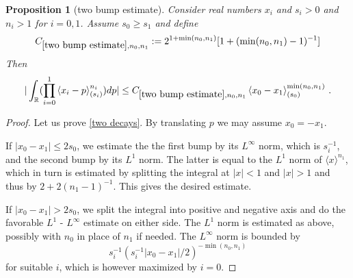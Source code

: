 \documentclass[12pt,reqno]{amsart}
\theoremstyle{plain}
\newtheorem{proposition}[theorem]{Proposition}
\numberwithin{equation}{section}
\theoremstyle{remark}
\newcommand{\R}{{\mathbb R}}
\begin{document}
\begin{proposition}[two bump estimate]\label{two bump estimate}
    Consider real numbers $x_i$ and  $s_i>0$ and $n_i>1$ for $i=0,1$.  Assume $s_0\ge s_1$ and define
\begin{equation}\label{tb0}
     C_{\ref{two bump estimate},n_0,n_1}:=2^{1+\min(n_0,n_1)} [1+(\min(n_0,n_1)-1)^{-1}]
\end{equation}
  Then
\begin{equation}\label{two decays}
   | \int_{\R} (\prod_{i=0}^1 \left<x_i-p\right>^{n_i}_{(s_i)}) dp|\le C_{\ref{two bump estimate},n_0,n_1}
\left<x_0-x_1\right>^{\min(n_0,n_1)}_{(s_0)}\, .
\end{equation}
\end{proposition}
\begin{proof}
Let us prove \eqref{two decays}.
By translating $p$ we may assume $x_0=-x_1$.

If $|x_0-x_1|\le 2s_0$, we estimate the the first bump
by its $L^\infty$ norm, which is $s_i^{-1}$, and the second bump by its $L^1$ norm.
The latter is equal to the $L^1$ norm of $\langle x\rangle^{n_1}$, which in turn is estimated by splitting the integral
at $|x|<1$ and $|x|>1$ and thus by $2+2(n_1-1)^{-1}$. This gives the desired estimate.

If $|x_0-x_1|> 2s_0$, we split the integral into positive and negative axis
and do the favorable $L^1$ - $L^\infty$ estimate on either side.
The $L^1$ norm is estimated as above, possibly with $n_0$ in place of $n_1$ if needed. The $L^\infty$ norm is
bounded by
\begin{equation}
    s_i^{-1}(s_i^{-1}|x_0-x_1|/2)^{-\min(n_0,n_1)}
\end{equation}
for suitable $i$, which is however
maximized by $i=0$.
\end{proof}
\end{document}
